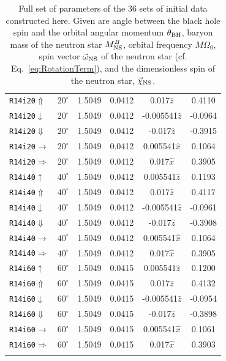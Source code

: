 \begin{longtable}{l|c|c|c|c|c}
{\tt R14i20$\Uparrow$}&$20^\circ$ & 1.5049 & 0.0412  & 0.017$\hat{z}$ & 0.4110\\
{\tt R14i20$\downarrow$}&$20^\circ$ & 1.5049 & 0.0412  &  -0.005541$\hat{z}$& -0.0964\\
{\tt R14i20$\Downarrow$}&$20^\circ$ & 1.5049 & 0.0412  & -0.017$\hat{z}$ & -0.3915\\
{\tt R14i20$\rightarrow$}&$20^\circ$ & 1.5049 & 0.0412  & 0.005541$\hat{x}$ & 0.1064\\
{\tt R14i20$\Rightarrow$}&$20^\circ$ & 1.5049 & 0.0412  & 0.017$\hat{x}$ & 0.3905 \\
\hline
{\tt R14i40$\uparrow$}&$40^\circ$ & 1.5049 & 0.0412  &  0.005541$\hat{z}$ & 0.1193 \\
{\tt R14i40$\Uparrow$}&$40^\circ$ & 1.5049 & 0.0412  & 0.017$\hat{z}$ & 0.4117\\
{\tt R14i40$\downarrow$}&$40^\circ$ & 1.5049 & 0.0412  & -0.005541$\hat{z}$& -0.0961\\
{\tt R14i40$\Downarrow$}&$40^\circ$ & 1.5049 & 0.0412  & -0.017$\hat{z}$ & -0.3908\\
{\tt R14i40$\rightarrow$}&$40^\circ$ & 1.5049 & 0.0412 & 0.005541$\hat{x}$ & 0.1064\\
{\tt R14i40$\Rightarrow$}&$40^\circ$ & 1.5049 & 0.0412  & 0.017$\hat{x}$ & 0.3905 \\
\hline
{\tt R14i60$\uparrow$}&$60^\circ$ & 1.5049 & 0.0415  &  0.005541$\hat{z}$ & 0.1200 \\
{\tt R14i60$\Uparrow$}&$60^\circ$ & 1.5049 & 0.0415  & 0.017$\hat{z}$ & 0.4132\\
{\tt R14i60$\downarrow$}&$60^\circ$ & 1.5049 & 0.0415  & -0.005541$\hat{z}$& -0.0954\\
{\tt R14i60$\Downarrow$}&$60^\circ$ & 1.5049 & 0.0415 & -0.017$\hat{z}$ & -0.3898\\
{\tt R14i60$\rightarrow$}&$60^\circ$ & 1.5049 & 0.0415 & 0.005541$\hat{x}$ & 0.1061\\
{\tt R14i60$\Rightarrow$}&$60^\circ$ & 1.5049 & 0.0415 & 0.017$\hat{x}$ & 0.3903\\
\hline
\caption[Initial data set parameters for series of 36 BH-NS initial
data sets.]{\label{tab:36Sets} Full set of parameters of
 the 36 sets of initial data constructed here. Given are 
 angle between the black hole spin and the orbital angular
  momentum $\theta_{\rm BH}$, baryon mass of the neutron star  $M^B_{\rm NS}$, orbital frequency $M\Omega_0$, spin vector $\vec{\omega}_{\rm NS}$ of the neutron star (cf. Eq.~\ref{eq:RotationTerm}), and the dimensionless spin of the neutron star, $\vec{\chi}_{\rm NS}$.}
\end{longtable}

